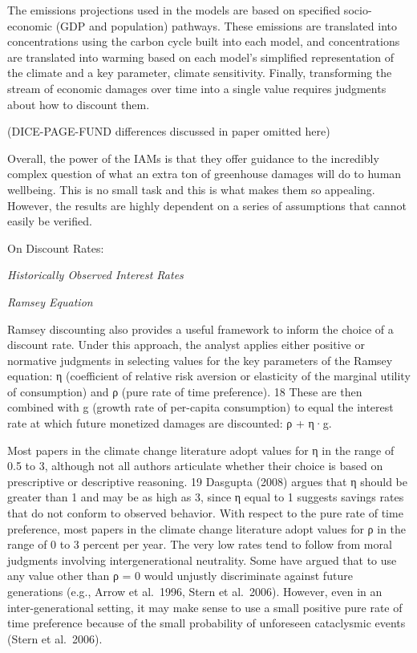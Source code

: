 \documentclass[
]{book}
\begin{document}
The emissions projections used in the models are based on specified socio-
economic (GDP and population) pathways. These emissions are translated into concentrations
using the carbon cycle built into each model, and concentrations are translated into warming
based on each model's simplified representation of the climate and a key parameter, climate
sensitivity. Finally, transforming the stream of economic damages over time into a single value
requires judgments about how to discount them.

(DICE-PAGE-FUND differences discussed in paper omitted here)

Overall, the power of the IAMs is that they offer guidance to the incredibly complex question of
what an extra ton of greenhouse damages will do to human wellbeing. This is no small task and
this is what makes them so appealing. However, the results are highly dependent on a series of
assumptions that cannot easily be verified.

On Discount Rates:

\emph{Historically Observed Interest Rates}

\emph{Ramsey Equation}

Ramsey discounting also provides a useful framework to inform the choice of a discount rate.
Under this approach, the analyst applies either positive or normative judgments in selecting
values for the key parameters of the Ramsey equation: η (coefficient of relative risk aversion or
elasticity of the marginal utility of consumption) and ρ (pure rate of time preference). 18 These
are then combined with g (growth rate of per-capita consumption) to equal the interest rate at
which future monetized damages are discounted: ρ + η·g.

Most papers in the climate change literature adopt values for η in the range of 0.5 to 3, although
not all authors articulate whether their choice is based on prescriptive or descriptive reasoning. 19
Dasgupta (2008) argues that η should be greater than 1 and may be as high as 3, since η equal to
1 suggests savings rates that do not conform to observed behavior. With respect to the pure rate
of time preference, most papers in the climate change literature adopt values for ρ in the range of
0 to 3 percent per year. The very low rates tend to follow from moral judgments involving
intergenerational neutrality. Some have argued that to use any value other than ρ = 0 would
unjustly discriminate against future generations (e.g., Arrow et al.~1996, Stern et al.~2006).
However, even in an inter-generational setting, it may make sense to use a small positive pure
rate of time preference because of the small probability of unforeseen cataclysmic events (Stern
et al.~2006).
\end{document}
